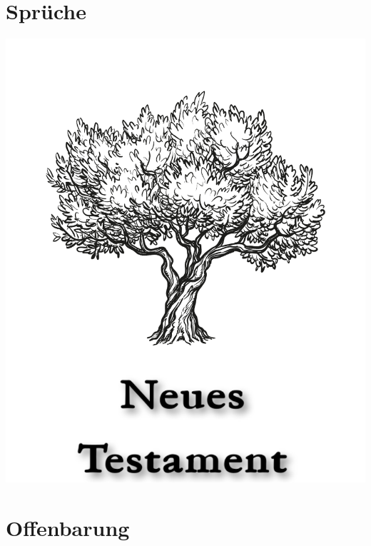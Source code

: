 \documentclass[14pt, b5paper, twoside]{extbook}
\begin{document}
\chapter{Sprüche}
\begin{multicols}{2}
  
\end{multicols}
\newpage

\pagestyle{empty}

\null\vfill
\begin{center}
\begin{minipage}[c]{\textwidth}
  \begin{center}
  \includegraphics{NeuesTestamentTitel.pdf}
  \end{center}
\end{minipage}
\end{center}
\null\vfill
\newpage

\chapter{Offenbarung}
\begin{multicols}{2}
  \parskip=0pt \relax
  
\end{multicols}
\newpage
\end{document}
